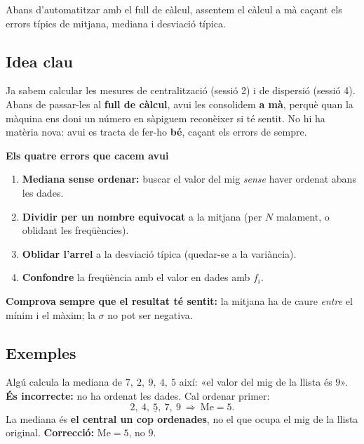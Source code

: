 %
{Abans d'automatitzar amb el full de càlcul, assentem el càlcul a mà caçant els errors típics de mitjana, mediana i desviació típica.}

\subsection{Idea clau}

Ja sabem calcular les mesures de centralització (sessió 2) i de dispersió (sessió 4).
Abans de passar-les al \textbf{full de càlcul}, avui les consolidem \textbf{a mà},
perquè quan la màquina ens doni un número en sàpiguem reconèixer si té sentit. No hi
ha matèria nova: avui es tracta de fer-ho \textbf{bé}, caçant els errors de sempre.

\begin{idea}
\textbf{Els quatre errors que cacem avui}
\begin{enumerate}[leftmargin=1.6em, itemsep=2pt]
  \item \textbf{Mediana sense ordenar:} buscar el valor del mig \emph{sense} haver
        ordenat abans les dades.
  \item \textbf{Dividir per un nombre equivocat} a la mitjana (per $N$ malament, o
        oblidant les freqüències).
  \item \textbf{Oblidar l'arrel} a la desviació típica (quedar-se a la variància).
  \item \textbf{Confondre} la freqüència amb el valor en dades amb $f_i$.
\end{enumerate}
\textbf{Comprova sempre que el resultat té sentit:} la mitjana ha de caure
\emph{entre} el mínim i el màxim; la $\sigma$ no pot ser negativa.
\end{idea}

\subsection{Exemples}

\begin{exemple}
Algú calcula la mediana de $7,\ 2,\ 9,\ 4,\ 5$ així: «el valor del mig de la llista és
$9$». \textbf{És incorrecte:} no ha ordenat les dades. Cal ordenar primer:
\[
2,\ 4,\ \underline{5},\ 7,\ 9 \ \Rightarrow\ \text{Me}=5.
\]
La mediana és \textbf{el central un cop ordenades}, no el que ocupa el mig de la
llista original. \textbf{Correcció:} $\text{Me}=5$, no $9$.
\end{exemple}

